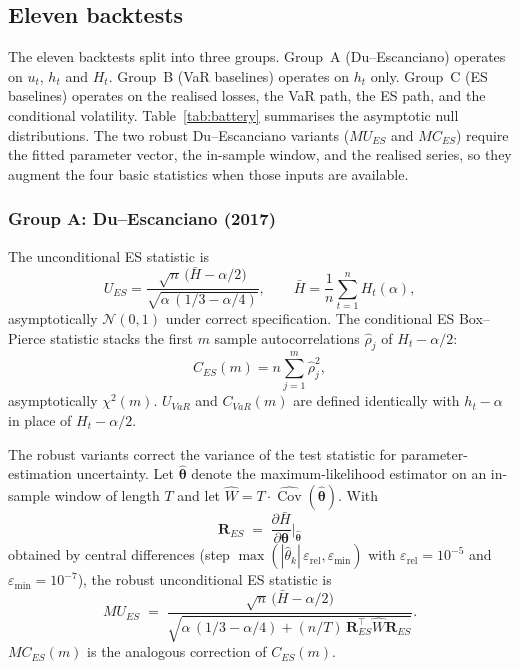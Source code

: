 \documentclass[11pt,a4paper]{article}
\newcommand{\Cov}{\operatorname{Cov}}
\theoremstyle{plain}
\begin{document}
\subsection{Eleven backtests}
\label{sec:method-battery}

The eleven backtests split into three groups. Group~A
(Du--Escanciano) operates on $u_t$, $h_t$ and $H_t$. Group~B (VaR
baselines) operates on $h_t$ only. Group~C (ES baselines) operates on
the realised losses, the VaR path, the ES path, and the conditional
volatility. Table~\ref{tab:battery} summarises the asymptotic null
distributions. The two robust Du--Escanciano variants ($MU_{ES}$ and
$MC_{ES}$) require the fitted parameter vector, the in-sample window,
and the realised series, so they augment the four basic statistics
when those inputs are available.

\subsubsection*{Group A: Du--Escanciano (2017)}

The unconditional ES statistic is
\begin{equation}
  U_{ES} = \frac{\sqrt{n}\,\bigl(\bar{H} - \alpha/2\bigr)}{\sqrt{\alpha\,(1/3 - \alpha/4)}},
  \qquad \bar{H} = \frac{1}{n}\sum_{t=1}^n H_t(\alpha),
  \label{eq:U_ES}
\end{equation}
asymptotically $\mathcal{N}(0,1)$ under correct specification. The
conditional ES Box--Pierce statistic stacks the first $m$ sample
autocorrelations $\hat{\rho}_j$ of $H_t - \alpha/2$:
\begin{equation}
  C_{ES}(m) = n \sum_{j=1}^{m} \hat{\rho}_j^2,
  \label{eq:C_ES}
\end{equation}
asymptotically $\chi^2(m)$. $U_{VaR}$ and $C_{VaR}(m)$ are defined
identically with $h_t - \alpha$ in place of $H_t - \alpha/2$.

The robust variants correct the variance of the test statistic for
parameter-estimation uncertainty. Let $\hat{\bm\theta}$ denote the
maximum-likelihood estimator on an in-sample window of length $T$ and
let $\hat{W} = T \cdot \widehat{\Cov}(\hat{\bm\theta})$. With
\begin{equation}
  \bm R_{ES} \;=\; \frac{\partial \bar{H}}{\partial \bm\theta}\bigg|_{\hat{\bm\theta}}
  \label{eq:R_ES}
\end{equation}
obtained by central differences (step
$\max(|\hat\theta_k|\,\varepsilon_{\text{rel}}, \varepsilon_{\text{min}})$
with $\varepsilon_{\text{rel}}=10^{-5}$ and
$\varepsilon_{\text{min}}=10^{-7}$), the robust unconditional ES
statistic is
\begin{equation}
  MU_{ES} \;=\; \frac{\sqrt{n}\,\bigl(\bar{H} - \alpha/2\bigr)}{\sqrt{\alpha\,(1/3-\alpha/4) + (n/T)\,\bm R_{ES}^\top \hat{W} \bm R_{ES}}}.
  \label{eq:MU_ES}
\end{equation}
$MC_{ES}(m)$ is the analogous correction of $C_{ES}(m)$.
\end{document}
